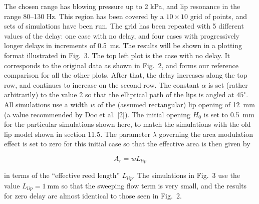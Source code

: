 
  The chosen range has blowing pressure up to 2 kPa, and lip resonance in the 
  range 80--130 Hz. This region has been covered by a $10 \times 10$ grid of 
  points, and sets of simulations have been run. The grid has been repeated 
  with 5 different values of the delay: one case with no delay, and four cases 
  with progressively longer delays in increments of 0.5~ms. The results will be 
  shown in a plotting format illustrated in Fig.\ 3. The top left plot is the 
  case with no delay. It corresponds to the original data as shown in Fig.\ 2, 
  and forms our reference comparison for all the other plots. After that, the 
  delay increases along the top row, and continues to increase on the second 
  row. The constant $\alpha$ is set (rather arbitrarily) to the value 2 so that 
  the elliptical path of the lips is angled at $45^\circ$. All simulations use 
  a width $w$ of the (assumed rectangular) lip opening of 12~mm (a value 
  recommended by Doc et al. [2]). The initial opening $H_0$ is set to 0.5~mm 
  for the particular simulations shown here, to match the simulations with the 
  old lip model shown in section 11.5. The parameter $\lambda$ governing the 
  area modulation effect is set to zero for this initial case so that the 
  effective area is then given by 

  \begin{equation*}A_r=w L_{lip} \tag{5}\end{equation*} 

  \noindent{}in terms of the ``effective reed length'' $L_{lip}$. The 
  simulations in Fig.\ 3 use the value $L_{lip}=1 \mathrm{~mm}$ so that the 
  sweeping flow term is very small, and the results for zero delay are almost 
  identical to those seen in Fig.\ 2. 


